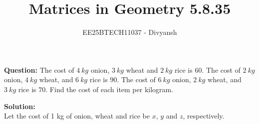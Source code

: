 \documentclass[journal,12pt,onecolumn]{IEEEtran}
\title{Matrices in Geometry 5.8.35}
\author{EE25BTECH11037 - Divyansh}
\theoremstyle{remark}
\begin{document}
\vspace{3cm}
\maketitle
{\let\newpage\relax\maketitle}
\textbf{Question: }
The cost of $4 \ kg$ onion, $3 \ kg$ wheat and $2\ kg$ rice is \rupee $60$. The cost of $2 \ kg$ onion, $4 \ kg$ wheat, and $6 \ kg$ rice is \rupee $90$. The cost of $6 \ kg$ onion, $2\ kg$ wheat, and $3\ kg$ rice is \rupee $70$. Find the cost of each item per kilogram.
 
\vspace{2mm}


\textbf{Solution:}
\\
Let the cost of 1 kg of onion, wheat and rice be \rupee $x$, \rupee $y$ and \rupee $z$, respectively.
\end{document}
